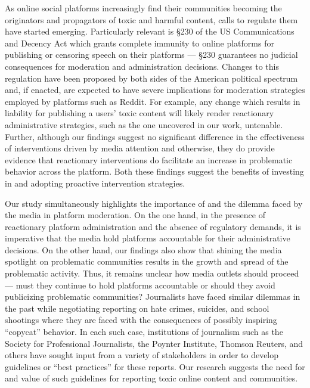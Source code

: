  As online social platforms increasingly
find their communities becoming the originators and propagators of toxic and
harmful content, calls to regulate them have started emerging. Particularly
relevant is \S230 of the US Communications and Decency Act which grants
complete immunity to online platforms for publishing or censoring speech on
their platforms --- \ie \S230 guarantees no judicial consequences for
moderation and administration decisions. Changes to this regulation have been
proposed by both sides of the American political spectrum and, if enacted, are
expected to have severe implications for moderation strategies employed by
platforms such as Reddit. For example, any change which results in liability
for publishing a users' toxic content will likely render reactionary
administrative strategies, such as the one uncovered in our work, untenable.
Further, although our findings suggest no significant difference in the
effectiveness of interventions driven by media attention and otherwise, they do
provide evidence that reactionary interventions do facilitate an increase in
problematic behavior across the platform. Both these findings suggest the
benefits of investing in and adopting proactive intervention strategies.

 Our study simultaneously highlights
the importance of and the dilemma faced by the media in platform moderation. On
the one hand, in the presence of reactionary platform administration and the
absence of regulatory demands, it is imperative that the media hold platforms
accountable for their administrative decisions. On the other hand, our findings
also show that shining the media spotlight on problematic communities 
results in the growth and spread of the problematic activity. Thus, it remains
unclear how media outlets should proceed --- must they continue to hold
platforms accountable or should they avoid publicizing problematic communities?
Journalists have faced similar dilemmas in the past while negotiating reporting
on hate crimes, suicides, and school shootings where they are faced with the
consequences of possibly inspiring ``copycat'' behavior. In each such case,
institutions of journalism such as the Society for Professional Journalists,
the Poynter Institute, Thomson Reuters, and others have sought input from
a variety of stakeholders in order to develop guidelines or ``best practices''
for these reports. Our research suggests the need for and value of such
guidelines for reporting toxic online content and communities.


